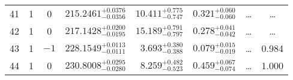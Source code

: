 \begin{table*}[!]
\begin{tabular}{llcrrlrc}
41 & 1 & 0 & $    215.2461_{-      0.0356}^{+      0.0376}$ & $      10.411_{-       0.747}^{+       0.775}$ & $       0.321_{-       0.060}^{+       0.060}$ & \multicolumn{1}{c}{\dots} & \dots \\[1pt]
42 & 1 & 0 & $    217.1428_{-      0.0195}^{+      0.0200}$ & $      15.189_{-       0.797}^{+       0.791}$ & $       0.278_{-       0.042}^{+       0.041}$ & \multicolumn{1}{c}{\dots} & \dots \\[1pt]

43 & 1 & $-1$ & $    228.1549_{-      0.0111}^{+      0.0113}$ & $       3.693_{-       0.388}^{+       0.380}$ & $       0.079_{-       0.019}^{+       0.015}$ & \multicolumn{1}{c}{\dots} & 0.984\\[1pt]
44 & 1 & 0 & $    230.8008_{-      0.0280}^{+      0.0295}$ & $       8.259_{-       0.523}^{+       0.482}$ & $       0.459_{-       0.074}^{+       0.067}$ & \multicolumn{1}{c}{\dots} & 1.000\\[1pt]

\hline
\end{tabular}
\end{table*}


